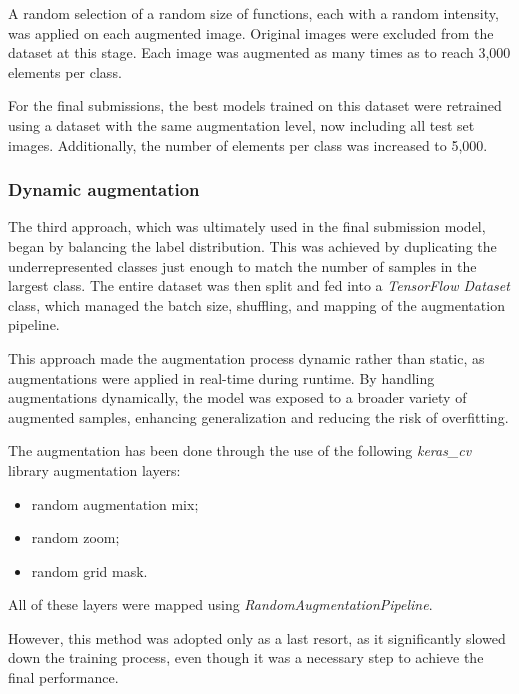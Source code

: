 \documentclass[11pt]{article}
\begin{document}
A random selection of a random size of functions, each with a random intensity, was applied on each augmented image.
Original images were excluded from the dataset at this stage. 
Each image was augmented as many times as to reach 3,000 elements per class.

For the final submissions, the best models trained on this dataset were retrained using a dataset with the same augmentation level, now including all test set images. 
Additionally, the number of elements per class was increased to 5,000.

\subsubsection{Dynamic augmentation}

The third approach, which was ultimately used in the final submission model, began by balancing the label distribution.
This was achieved by duplicating the underrepresented classes just enough to match the number of samples in the largest class.
The entire dataset was then split and fed into a \textit{TensorFlow Dataset} class, which managed the batch size, shuffling, and mapping of the augmentation pipeline.

This approach made the augmentation process dynamic rather than static, as augmentations were applied in real-time during runtime. 
By handling augmentations dynamically, the model was exposed to a broader variety of augmented samples, enhancing generalization and reducing the risk of overfitting.

The augmentation has been done through the use of the following \textit{keras\_cv} library augmentation layers:

\begin{itemize}
    \item random augmentation mix;
    \item random zoom;
    \item random grid mask.
\end{itemize}

All of these layers were mapped using \textit{RandomAugmentationPipeline}.

However, this method was adopted only as a last resort, as it significantly slowed down the training process, even though it was a necessary step to achieve the final performance.
\end{document}
